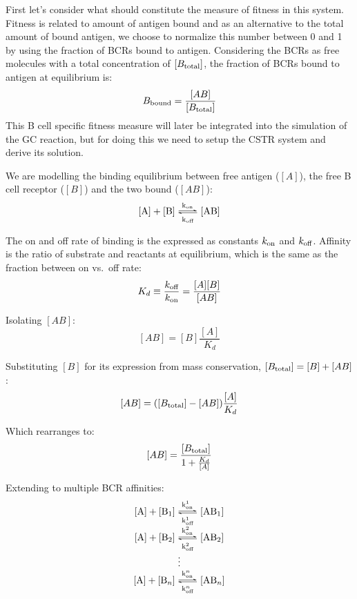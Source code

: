 First let's consider what should constitute the measure of fitness in this system.
Fitness is related to amount of antigen bound and as an alternative to the total amount of bound antigen, we choose to normalize this number between 0 and 1 by using the fraction of BCRs bound to antigen.
Considering the BCRs as free molecules with a total concentration of $[B_{\text{total}}]$, the fraction of BCRs bound to antigen at equilibrium is:
$$
B_{\text{bound}} = \frac{[AB]}{[B_{\text{total}}]}
$$
This B cell specific fitness measure will later be integrated into the simulation of the GC reaction, but for doing this we need to setup the CSTR system and derive its solution.


\noindent
We are modelling the binding equilibrium between free antigen ($[A]$), the free B cell receptor ($[B]$) and the two bound ($[AB]$):
\begin{equation}
\ce{[A] + [B] <=>[k_{\on}][k_{\off}] [AB]}
  \label{eq:bind1}
\end{equation}

\noindent
The on and off rate of binding is the expressed as constants $k_{\text{on}}$ and $k_{\text{off}}$. Affinity is the ratio of substrate and reactants at equilibrium, which is the same as the fraction between on vs.\ off rate:
\begin{equation}
K_d \equiv \frac{k_{\text{off}}}{k_{\text{on}}} = \frac{[A] [B]}{[AB]}
  \label{eq:Kd_def}
\end{equation}

\noindent
Isolating $[AB]$:
$$
[AB] = [B] \frac{[A]}{K_d}
$$

\noindent
Substituting $[B]$ for its expression from mass conservation, $[B_{\text{total}}] = [B] + [AB]$:
$$
[AB] = ([B_{\text{total}}] - [AB]) \frac{[A]}{K_d}
$$

\noindent
Which rearranges to:
$$
[AB] = \frac{[B_{\text{total}}]}{1 + \frac{K_d}{[A]}}
$$

\noindent
Extending to multiple BCR affinities:
\[
 \begin{matrix}
  \ce{[A] + [B_1] <=>[k^1_{\on}][k^1_{\off}] [AB_1]} \\
  \ce{[A] + [B_2] <=>[k^2_{\on}][k^2_{\off}] [AB_2]} \\
  \vdots \\
  \ce{[A] + [B_n] <=>[k^n_{\on}][k^n_{\off}] [AB_n]}
  \label{eq:ABi}
 \end{matrix}
\]

